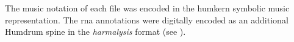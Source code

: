 
The music notation of each file was encoded in the
\gls{humkern} symbolic music representation. The \gls{rna}
annotations were digitally encoded as an additional Humdrum
\gls{spine} in the \emph{harmalysis} format (see
).
